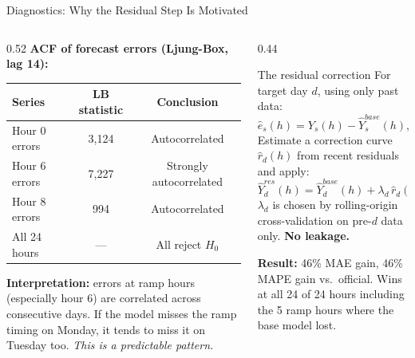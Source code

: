 \documentclass[10pt,aspectratio=169]{beamer}
\begin{document}
\begin{frame}{Diagnostics: Why the Residual Step Is Motivated}

  \begin{columns}
  \begin{column}{0.52\textwidth}
    \textbf{ACF of forecast errors (Ljung-Box, lag 14):}
    \vspace{0.2em}
    \begin{center}
    \small
    \begin{tabular}{lcc}
      \toprule
      Series & LB statistic & Conclusion \\
      \midrule
      Hour 0 errors & 3,124 & Autocorrelated \\
      Hour 6 errors & 7,227 & Strongly autocorrelated \\
      Hour 8 errors & 994   & Autocorrelated \\
      All 24 hours  & ---   & All reject $H_0$ \\
      \bottomrule
    \end{tabular}
    \end{center}
    \vspace{0.3em}
    \textbf{Interpretation:} errors at ramp hours (especially hour 6)
    are correlated across consecutive days.
    If the model misses the ramp timing on Monday, it tends to miss
    it on Tuesday too.
    \emph{This is a predictable pattern.}
  \end{column}
  \begin{column}{0.44\textwidth}
    \begin{block}{The residual correction}
      For target day $d$, using only past data:
      \[
        \hat{e}_s(h) = Y_s(h) - \hat{Y}_s^{base}(h), \quad s < d
      \]
      Estimate a correction curve $\hat{r}_d(h)$ from recent
      residuals and apply:
      \[
        \hat{Y}_d^{res}(h) = \hat{Y}_d^{base}(h) + \lambda_d\,\hat{r}_d(h)
      \]
      $\lambda_d$ is chosen by rolling-origin cross-validation
      on pre-$d$ data only. \textbf{No leakage.}
    \end{block}
    \vspace{0.3em}
    \textbf{Result:} 46\% MAE gain, 46\% MAPE gain vs.\ official.
    Wins at all 24 of 24 hours including the 5 ramp hours
    where the base model lost.
  \end{column}
  \end{columns}
\end{frame}
\end{document}

